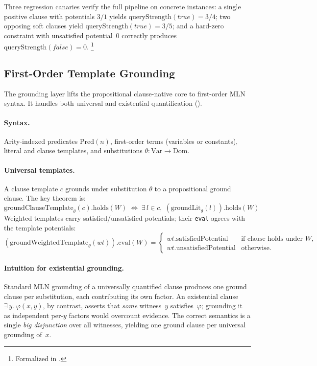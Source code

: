 \documentclass[11pt,openany]{report}
\begin{document}
Three regression canaries verify the full pipeline on concrete instances:
a single positive clause with potentials $3/1$ yields
$\mathrm{queryStrength}(\textit{true}) = 3/4$; two opposing soft clauses
yield $\mathrm{queryStrength}(\textit{true}) = 3/5$; and a hard-zero
constraint with unsatisfied potential~$0$ correctly produces
$\mathrm{queryStrength}(\textit{false}) = 0$.%
\footnote{Formalized in .}

\subsection{First-Order Template Grounding}

The grounding layer lifts the propositional clause-native core to
first-order MLN syntax.  It handles both universal and existential
quantification ().

\paragraph{Syntax.}
Arity-indexed predicates $\mathrm{Pred}(n)$, first-order terms (variables
or constants), literal and clause templates, and substitutions $\theta :
\mathrm{Var} \to \mathrm{Dom}$.

\paragraph{Universal templates.}
A clause template $c$ grounds under substitution $\theta$ to a
propositional ground clause.  The key theorem is:
\[
  \mathrm{groundClauseTemplate}_\theta(c).\mathrm{holds}(W)
  \;\Longleftrightarrow\;
  \exists\, l \in c,\; (\mathrm{groundLit}_\theta(l)).\mathrm{holds}(W)
\]
Weighted templates carry satisfied/unsatisfied potentials; their
\texttt{eval} agrees with the template potentials:
\[
  (\mathrm{groundWeightedTemplate}_\theta(\mathit{wt})).\mathrm{eval}(W)
  = \begin{cases}
    \mathit{wt}.\mathrm{satisfiedPotential}
      & \text{if clause holds under } W, \\
    \mathit{wt}.\mathrm{unsatisfiedPotential}
      & \text{otherwise.}
  \end{cases}
\]

\paragraph{Intuition for existential grounding.}
Standard MLN grounding of a universally quantified clause produces one
ground clause per substitution, each contributing its own factor.  An
existential clause $\exists\, y.\;\varphi(x,y)$, by contrast, asserts
that \emph{some} witness~$y$ satisfies~$\varphi$; grounding it as
independent per-$y$ factors would overcount evidence.  The correct
semantics is a single \emph{big disjunction} over all witnesses,
yielding one ground clause per universal grounding of~$x$.
\end{document}
